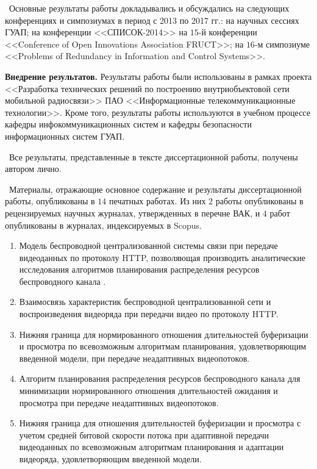 \probation\ Основные результаты работы докладывались и обсуждались на следующих конференциях и симпозиумах в период с 2013 по 2017 гг.: на научных сессиях ГУАП; на конференции <<СПИСОК-2014>> на $15$-й конференции <<Conference of Open Innovations Association FRUCT>>; на $16$-м симпозиуме <<Problems of Redundancy in Information and Control Systems>>.

\textbf{Внедрение результатов.} Результаты работы были использованы в рамках проекта <<Разработка технических решений по построению внутриобъектовой сети мобильной радиосвязи>> ПАО <<Информационные телекоммуникационные технологии>>. Кроме того, результаты работы используются в учебном процессе кафедры инфокоммуникационных систем и кафедры безопасности информационных систем ГУАП.

\contribution\ Все результаты, представленные в тексте диссертационной работы, получены автором лично.

\publications\ Материалы, отражающие основное содержание и результаты диссертационной работы, опубликованы в $14$ печатных работах. Из них $2$ работы опубликованы в рецензируемых научных журналах, утвержденных в перечне ВАК, и $4$ работ опубликованы в журналах, индексируемых в Scopus.

\begin{enumerate}
    \item Модель беспроводной централизованной системы связи при передаче видеоданных по протоколу HTTP, позволяющая производить аналитические исследования алгоритмов планирования распределения ресурсов беспроводного канала .
    \item Взаимосвязь характеристик беспроводной централизованной сети и воспроизведения видеоряда при передачи видео по протоколу HTTP.
    \item Нижняя граница для нормированного отношения длительностей буферизации и просмотра по всевозможным алгоритмам планирования, удовлетворяющим введенной модели, при передаче неадаптивных видеопотоков.
    \item Алгоритм планирования распределения ресурсов беспроводного канала для минимизации нормированного отношения длительностей ожидания и просмотра при передаче неадаптивных видеопотоков.
    \item Нижняя граница для отношения длительностей буферизации и просмотра с учетом средней битовой скорости потока при адаптивной передачи видеоданных по всевозможным алгоритмам планирования и адаптации видеоряда, удовлетворяющим введенной модели.
\end{enumerate}
